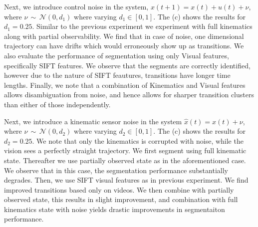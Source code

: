 Next, we introduce control noise in the system, $x(t+1) = x(t)+u(t)+\nu$, where $\nu\, \sim\, \mathcal{N}(0, d_1)$ where varying $d_1\in[0,1]$. The  (c) shows the results for $d_1=0.25$. Similar to the previous experiment we experiment with full kinematics along with partial observability. We find that in case of noise, one dimensional trajectory can have drifts which would erroneously show up as transitions. 
We also evaluate the performance of segmentation using only Visual features, specifically SIFT features. We observe that the segments are correctly identified, however due to the nature of SIFT feautures, transitions have longer time lengths.
Finally, we note that a combination of Kinematics and Visual features allows disambiguation from noise, and hence allows for sharper transition clusters than either of those independently. 

Next, we introduce a kinematic sensor noise in the system $\hat{x}(t)= x(t)+\nu$, where $\nu\, \sim\, \mathcal{N}(0, d_2)$ where varying $d_2\in[0,1]$. The  (c) shows the results for $d_2=0.25$. We note that only the kinematics is corrupted with noise, while the vision sees a perfectly straight trajectory. We first segment using full kinematic state. Thereafter we use partially observed state as in the aforementioned case. We observe that in this case, the segmentation performance substantially degrades. Then, we use SIFT visual features as in previous experiment. We find improved transitions based only on videos. We then combine with partially observed state, this results in slight improvement, and combination with full kinematics state with noise yields drastic improvements in segmentaiton performance. 

